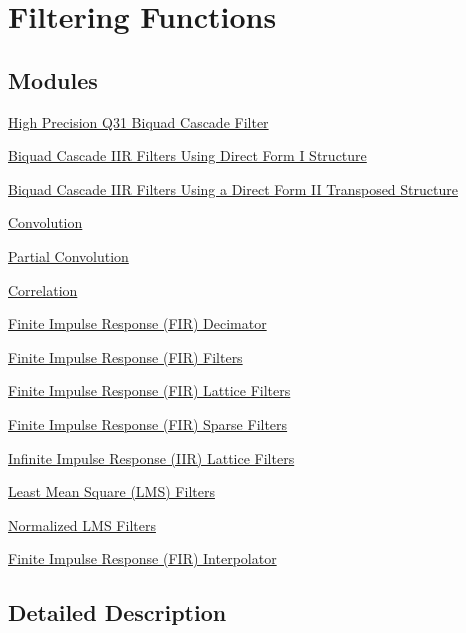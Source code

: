 \hypertarget{group__group_filters}{\section{Filtering Functions}
\label{group__group_filters}
}
\subsection*{Modules}
\begin{DoxyCompactItemize}
\item 
\hyperlink{group___biquad_cascade_d_f1__32x64}{High Precision Q31 Biquad Cascade Filter}
\item 
\hyperlink{group___biquad_cascade_d_f1}{Biquad Cascade I\-I\-R Filters Using Direct Form I Structure}
\item 
\hyperlink{group___biquad_cascade_d_f2_t}{Biquad Cascade I\-I\-R Filters Using a Direct Form I\-I Transposed Structure}
\item 
\hyperlink{group___conv}{Convolution}
\item 
\hyperlink{group___partial_conv}{Partial Convolution}
\item 
\hyperlink{group___corr}{Correlation}
\item 
\hyperlink{group___f_i_r__decimate}{Finite Impulse Response (\-F\-I\-R) Decimator}
\item 
\hyperlink{group___f_i_r}{Finite Impulse Response (\-F\-I\-R) Filters}
\item 
\hyperlink{group___f_i_r___lattice}{Finite Impulse Response (\-F\-I\-R) Lattice Filters}
\item 
\hyperlink{group___f_i_r___sparse}{Finite Impulse Response (\-F\-I\-R) Sparse Filters}
\item 
\hyperlink{group___i_i_r___lattice}{Infinite Impulse Response (\-I\-I\-R) Lattice Filters}
\item 
\hyperlink{group___l_m_s}{Least Mean Square (\-L\-M\-S) Filters}
\item 
\hyperlink{group___l_m_s___n_o_r_m}{Normalized L\-M\-S Filters}
\item 
\hyperlink{group___f_i_r___interpolate}{Finite Impulse Response (\-F\-I\-R) Interpolator}
\end{DoxyCompactItemize}


\subsection{Detailed Description}
